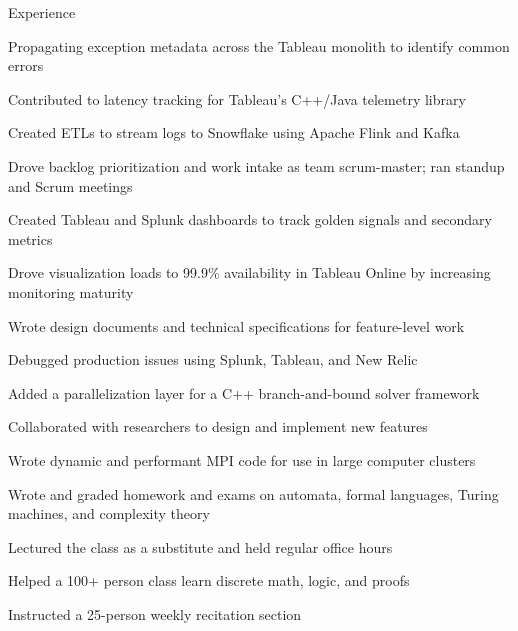 \documentclass{cv}
\begin{document}

\begin{cvsection}{Experience}
  {
    \item Propagating exception metadata across the Tableau monolith to identify common errors
    \item Contributed to latency tracking for Tableau's C++/Java telemetry library
    \item Created ETLs to stream logs to Snowflake using Apache Flink and Kafka
    \item Drove backlog prioritization and work intake as team scrum-master; ran standup and Scrum meetings
    \item Created Tableau and Splunk dashboards to track golden signals and secondary metrics
    \item Drove visualization loads to 99.9\% availability in Tableau Online by increasing monitoring maturity
    \item Wrote design documents and technical specifications for feature-level work
    \item Debugged production issues using Splunk, Tableau, and New Relic
  }
  {
    \item Added a parallelization layer for a C++ branch-and-bound solver framework
    \item Collaborated with researchers to design and implement new features
    \item Wrote dynamic and performant MPI code for use in large computer clusters
  }
  {
    \item Wrote and graded homework and exams on automata, formal languages, Turing machines, and complexity theory
    \item Lectured the class as a substitute and held regular office hours
  }
  {
    \item Helped a 100+ person class learn discrete math, logic, and proofs
    \item Instructed a 25-person weekly recitation section
  }
\end{cvsection}
\end{document}
